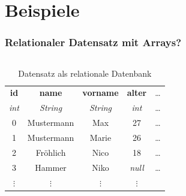 \section{Beispiele}

\begin{frame}
    \frametitle{Relationaler Datensatz mit Arrays?}

    \begin{columns}[T,onlytextwidth]
            \begin{table}
                \centering
                \begin{adjustbox}{width=\textwidth}
                    \small
                    \begin{tabular}[c]{|c|c|c|c|c}

                        \hline

                        \multicolumn{1}{|c|}{\textbf{id}} &
                        \multicolumn{1}{c|}{\textbf{name}} &
                        \multicolumn{1}{c|}{\textbf{vorname}} &
                        \multicolumn{1}{c|}{\textbf{alter}} &
                        \multicolumn{1}{c}{\dots} \\

                        \multicolumn{1}{|c|}{\textit{int}} &
                        \multicolumn{1}{c|}{\textit{String}} &
                        \multicolumn{1}{c|}{\textit{String}} &
                        \multicolumn{1}{c|}{\textit{int}} &
                        \multicolumn{1}{c}{\dots} \\

                        \hline

                        0  & Mustermann  & Max    & 27             & \dots \\
                        1  & Mustermann  & Marie  & 26             & \dots \\
                        2  & Fröhlich    & Nico   & 18             & \dots \\
                        3  & Hammer      & Niko   & \textit{null}  & \dots \\
                        $\vdots$ & $\vdots$ & $\vdots$ & $\vdots$ &

                    \end{tabular}
                \end{adjustbox}
                \caption{Datensatz  als relationale Datenbank}
                \label{tab:erwachsene1}
            \end{table}


\end{columns}
\end{frame}

